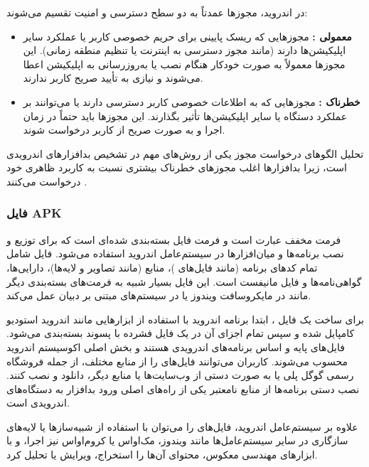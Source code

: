 در اندروید، مجوزها عمدتاً به دو سطح دسترسی و امنیت تقسیم می‌شوند:
\begin{itemize}
    \item \textbf{معمولی :} مجوزهایی که ریسک پایینی برای حریم خصوصی کاربر یا عملکرد سایر اپلیکیشن‌ها دارند (مانند مجوز دسترسی به اینترنت یا تنظیم منطقه زمانی). این مجوزها معمولاً به صورت خودکار هنگام نصب یا به‌روزرسانی به اپلیکیشن اعطا می‌شوند و نیازی به تأیید صریح کاربر ندارند.
    \item \textbf{خطرناک :} مجوزهایی که به اطلاعات خصوصی کاربر دسترسی دارند یا می‌توانند بر عملکرد دستگاه یا سایر اپلیکیشن‌ها تأثیر بگذارند. این مجوزها باید حتماً در زمان اجرا و به صورت صریح از کاربر درخواست شوند.
\end{itemize}
تحلیل الگوهای درخواست مجوز یکی از روش‌های مهم در تشخیص بدافزارهای اندرویدی است، زیرا بدافزارها اغلب مجوزهای خطرناک بیشتری نسبت به کاربرد ظاهری خود درخواست می‌کنند \cite{Drebin}.

\subsubsection{فایل APK}
فرمت  مخفف عبارت  است و فرمت فایل بسته‌بندی شده‌ای است که برای توزیع و نصب برنامه‌ها و میان‌افزارها در سیستم‌عامل اندروید استفاده می‌شود. فایل  شامل تمام کدهای برنامه (مانند فایل‌های )، منابع (مانند تصاویر و لایه‌ها)، دارایی‌ها، گواهی‌نامه‌ها و فایل مانیفست  است. این فایل بسیار شبیه به فرمت‌های بسته‌بندی دیگر مانند  در مایکروسافت ویندوز یا  در سیستم‌های مبتنی بر دبیان عمل می‌کند.

برای ساخت یک فایل ، ابتدا برنامه اندروید با استفاده از ابزارهایی مانند اندروید استودیو کامپایل شده و سپس تمام اجزای آن در یک فایل فشرده با پسوند  بسته‌بندی می‌شود. فایل‌های  پایه و اساس برنامه‌های اندرویدی هستند و بخش اصلی اکوسیستم اندروید محسوب می‌شوند. کاربران می‌توانند فایل‌های  را از منابع مختلف، از جمله فروشگاه رسمی گوگل پلی  یا به صورت دستی  از وب‌سایت‌ها یا منابع دیگر، دانلود و نصب کنند. نصب دستی برنامه‌ها از منابع نامعتبر یکی از راه‌های اصلی ورود بدافزار به دستگاه‌های اندرویدی است.

علاوه بر سیستم‌عامل اندروید، فایل‌های  را می‌توان با استفاده از شبیه‌سازها یا لایه‌های سازگاری در سایر سیستم‌عامل‌ها مانند ویندوز، مک‌اواس یا کروم‌اواس نیز اجرا، و با ابزارهای مهندسی معکوس، محتوای آن‌ها را استخراج، ویرایش یا تحلیل کرد.

